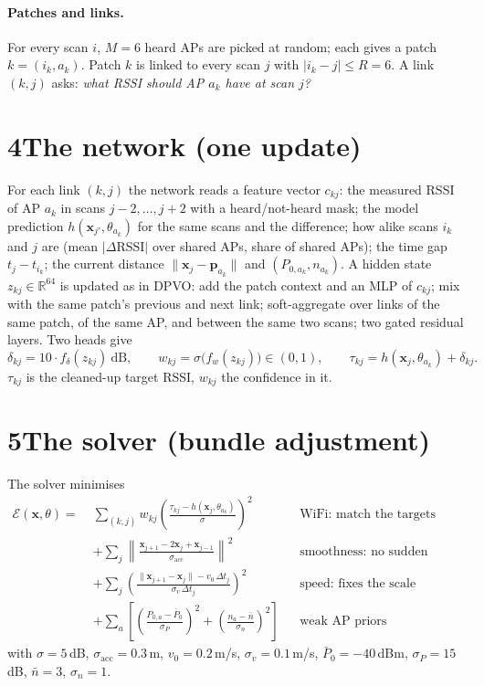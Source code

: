 \documentclass[11pt]{article}
\newcommand{\x}{\mathbf{x}}
\newcommand{\p}{\mathbf{p}}
\begin{document}
\paragraph{Patches and links.} For every scan $i$, $M=6$ heard APs are picked at random; each gives a
patch $k=(i_k,a_k)$. Patch $k$ is linked to every scan $j$ with $|i_k-j|\le R=6$. A link $(k,j)$ asks:
\emph{what RSSI should AP $a_k$ have at scan $j$?}

\section*{4\quad The network (one update)}
For each link $(k,j)$ the network reads a feature vector $c_{kj}$:
the measured RSSI of AP $a_k$ in scans $j-2,\dots,j+2$ with a heard/not-heard mask;
the model prediction $h(\x_{j'},\theta_{a_k})$ for the same scans and the difference;
how alike scans $i_k$ and $j$ are (mean $|\Delta$RSSI$|$ over shared APs, share of shared APs);
the time gap $t_j-t_{i_k}$; the current distance $\lVert\x_j-\p_{a_k}\rVert$ and $(P_{0,a_k},n_{a_k})$.
A hidden state $z_{kj}\in\mathbb{R}^{64}$ is updated as in DPVO: add the patch context and an MLP of
$c_{kj}$; mix with the same patch's previous and next link; soft-aggregate over links of the same patch,
of the same AP, and between the same two scans; two gated residual layers. Two heads give
\begin{equation}
\delta_{kj}=10\cdot f_\delta(z_{kj})\ \text{dB},\qquad w_{kj}=\sigma\!\big(f_w(z_{kj})\big)\in(0,1),\qquad
\tau_{kj}=h(\x_j,\theta_{a_k})+\delta_{kj}.
\end{equation}
$\tau_{kj}$ is the cleaned-up target RSSI, $w_{kj}$ the confidence in it.

\section*{5\quad The solver (bundle adjustment)}
The solver minimises
\begin{align}
\mathcal{E}(\x,\theta)=\;&\sum_{(k,j)} w_{kj}\left(\frac{\tau_{kj}-h(\x_j,\theta_{a_k})}{\sigma}\right)^{\!2}
&&\text{WiFi: match the targets}\nonumber\\
&+\sum_{j}\left\lVert\frac{\x_{j+1}-2\x_j+\x_{j-1}}{\sigma_{\text{acc}}}\right\rVert^2
&&\text{smoothness: no sudden change of step}\nonumber\\
&+\sum_{j}\left(\frac{\lVert\x_{j+1}-\x_j\rVert-v_0\,\Delta t_j}{\sigma_v\,\Delta t_j}\right)^{\!2}
&&\text{speed: fixes the scale}\nonumber\\
&+\sum_a\left[\left(\frac{P_{0,a}-\bar P_0}{\sigma_P}\right)^{\!2}+\left(\frac{n_a-\bar n}{\sigma_n}\right)^{\!2}\right]
&&\text{weak AP priors}
\end{align}
with $\sigma=5$\,dB, $\sigma_{\text{acc}}=0.3$\,m, $v_0=0.2$\,m/s, $\sigma_v=0.1$\,m/s, $\bar P_0=-40$\,dBm,
$\sigma_P=15$\,dB, $\bar n=3$, $\sigma_n=1$.
\end{document}
